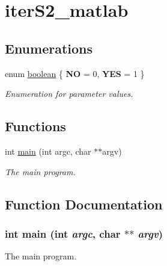 \hypertarget{group__applications__iterS2__matlab}{
\section{iter\-S2\_\-matlab}
\label{group__applications__iterS2__matlab}
}
\subsection*{Enumerations}
\begin{CompactItemize}
\item 
enum \hyperlink{group__applications__iterS2__matlab_ga1}{boolean} \{ {\bf NO} =  0, 
{\bf YES} =  1
 \}
\begin{CompactList}\small\item\em Enumeration for parameter values. \item\end{CompactList}\end{CompactItemize}
\subsection*{Functions}
\begin{CompactItemize}
\item 
int \hyperlink{group__applications__iterS2__matlab_ga0}{main} (int argc, char $\ast$$\ast$argv)
\begin{CompactList}\small\item\em The main program. \item\end{CompactList}\end{CompactItemize}


\subsection{Function Documentation}
\hypertarget{group__applications__iterS2__matlab_ga0}{
\subsubsection[main]{\setlength{\rightskip}{0pt plus 5cm}int main (int {\em argc}, char $\ast$$\ast$ {\em argv})}}
\label{group__applications__iterS2__matlab_ga0}


The main program. 

